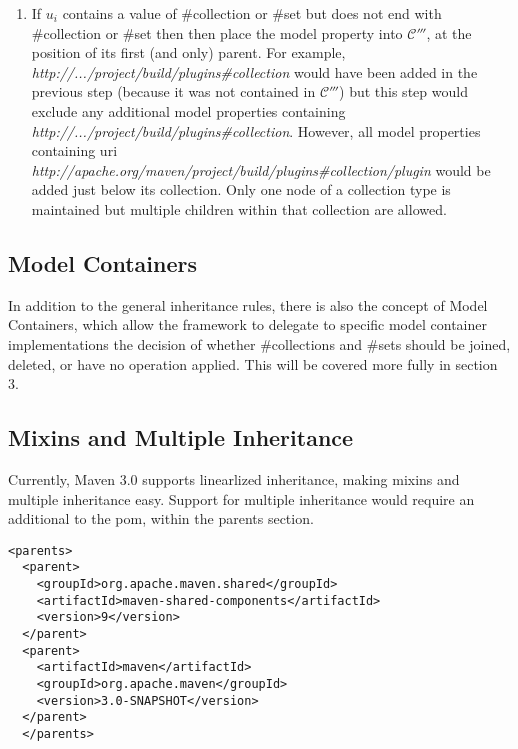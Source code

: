 \documentclass[12pt]{amsart}
\begin{document}
\begin{enumerate}
\item If \begin{math}u_{i}\end{math} contains a value of \#collection or \#set but does not end with  \#collection or \#set then  then place the model property into \begin{math}\mathcal{C'''}\end{math}, at the position of its first (and only) parent. For example,\emph{ http://.../project/build/plugins\#collection }would have been added in the previous step (because it was not contained in \begin{math}\mathcal{C'''}\end{math}) but this step would exclude any additional model properties containing \emph{http://.../project/build/plugins\#collection}.  However, all model properties containing uri \emph{http://apache.org/maven/project/build/plugins\#collection/plugin} would be added just below its collection. Only one node of a collection type is maintained but multiple children within that collection are allowed.

\end{enumerate}

\subsection{Model Containers}
In addition to the general inheritance rules, there is also the concept of Model Containers, which allow the framework to delegate to specific model container implementations the decision of whether \#collections and \#sets should be joined, deleted, or have no operation applied. This will be covered more fully in section 3.

\subsection{Mixins and Multiple Inheritance}
Currently, Maven 3.0 supports linearlized inheritance, making mixins and multiple inheritance easy. Support for multiple inheritance would require an additional to the pom, within the parents section.

\begin{verbatim}
<parents>
  <parent>
    <groupId>org.apache.maven.shared</groupId>
    <artifactId>maven-shared-components</artifactId>
    <version>9</version>
  </parent>
  <parent>
    <artifactId>maven</artifactId>
    <groupId>org.apache.maven</groupId>
    <version>3.0-SNAPSHOT</version>
  </parent>
  </parents>
\end{verbatim}
\end{document}
